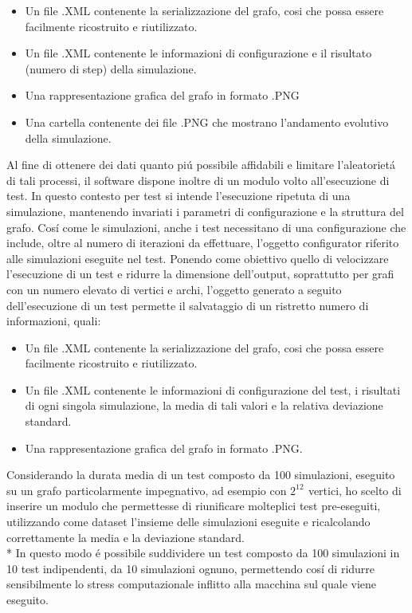 \documentclass[../Tesi.tex]{subfiles}
\begin{document}
\begin{itemize}
\item Un file .XML contenente la serializzazione del grafo, cosi che possa essere facilmente ricostruito e riutilizzato.
\item Un file .XML contenente le informazioni di configurazione e il risultato (numero di step) della simulazione.
\item Una rappresentazione grafica del grafo in formato .PNG
\item Una cartella contenente dei file .PNG che mostrano l'andamento evolutivo della simulazione.
\end{itemize}
Al fine di ottenere dei dati quanto pi\'u possibile affidabili e limitare l'aleatoriet\'a di tali processi, il software dispone inoltre di un modulo volto all'esecuzione di test. In questo contesto per test si intende l'esecuzione ripetuta di una simulazione, mantenendo invariati i parametri di configurazione e la struttura del grafo. Cos\'i come le simulazioni, anche i test necessitano di una configurazione che include, oltre al numero di iterazioni da effettuare, l'oggetto configurator riferito alle simulazioni eseguite nel test.
Ponendo come obiettivo quello di velocizzare l'esecuzione di un test e ridurre la dimensione dell'output, soprattutto per grafi con un numero elevato di vertici e archi, l'oggetto generato a seguito dell'esecuzione di un test permette il salvataggio di un ristretto numero di informazioni, quali:
\begin{itemize}
\item Un file .XML contenente la serializzazione del grafo, cosi che possa essere facilmente ricostruito e riutilizzato.
\item Un file .XML contenente le informazioni di configurazione del test, i risultati di ogni singola simulazione, la media di tali valori e la relativa deviazione standard.
\item Una rappresentazione grafica del grafo in formato .PNG.
\end{itemize}
Considerando la durata media di un test composto da 100 simulazioni, eseguito su un grafo particolarmente impegnativo, ad esempio con $2^{12^{\mathrm{}}}$ vertici, ho scelto di inserire un modulo che permettesse di riunificare molteplici test pre-eseguiti, utilizzando come dataset l'insieme delle simulazioni eseguite e ricalcolando correttamente la media e la deviazione standard.\\*
In questo modo \'e possibile suddividere un test composto da 100 simulazioni in 10 test indipendenti, da 10 simulazioni ognuno, permettendo cos\'i di ridurre sensibilmente lo stress computazionale inflitto alla macchina sul quale viene eseguito.\\
\end{document}
